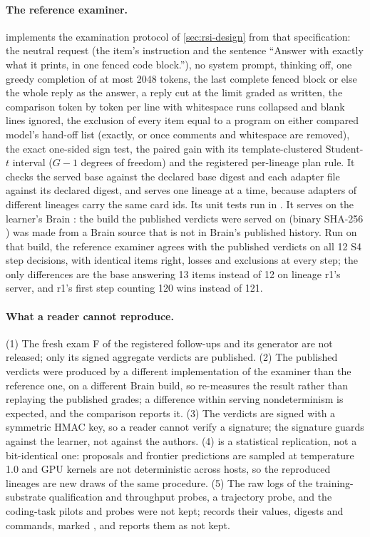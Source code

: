 \paragraph{The reference examiner.}  implements the examination protocol
of \cref{sec:rsi-design} from that specification: the neutral request (the item's instruction and the
sentence ``Answer with exactly what it prints, in one fenced code block.''), no system prompt,
thinking off, one greedy completion of at most 2048 tokens, the last complete fenced block or else the
whole reply as the answer, a reply cut at the limit graded as written, the comparison token by token
per line with whitespace runs collapsed and blank lines ignored, the exclusion of every item equal to
a program on either compared model's hand-off list (exactly, or once comments and whitespace are
removed), the exact one-sided sign test, the paired gain with its template-clustered Student-$t$
interval ($G-1$ degrees of freedom) and the registered per-lineage plan rule. It checks the served
base against the declared base digest and each adapter file against its declared digest, and
serves one lineage at a time, because adapters of different lineages carry the same card ids. Its
unit tests run in . It serves on the learner's Brain : the build the
published verdicts were served on (binary SHA-256 ) was made from a Brain source
that is not in Brain's published history. Run on that build, the reference examiner agrees with the published verdicts on
all 12 S4 step decisions, with identical items right, losses and exclusions at every step; the only
differences are the base answering 13 items instead of 12 on lineage r1's server, and r1's first step
counting 120 wins instead of 121.

\paragraph{What a reader cannot reproduce.} (1) The fresh exam F of the registered follow-ups and its
generator are not released; only its signed aggregate verdicts are published.
(2) The published verdicts were produced by a different implementation of the examiner than the
reference one, on a different Brain build, so  re-measures the result rather
than replaying the published grades; a difference within serving nondeterminism is expected, and
the comparison reports it. (3) The verdicts are signed with a symmetric HMAC key, so a reader cannot
verify a signature; the signature guards against the learner, not against the authors.
(4)  is a statistical replication, not a bit-identical one: proposals and
frontier predictions are sampled at temperature 1.0 and GPU kernels are not deterministic across
hosts, so the reproduced lineages are new draws of the same procedure. (5) The raw logs of the
training-substrate qualification and throughput probes, a trajectory probe, and the coding-task pilots
and probes were not kept;  records their values, digests and commands, marked
, and  reports them as not kept.

